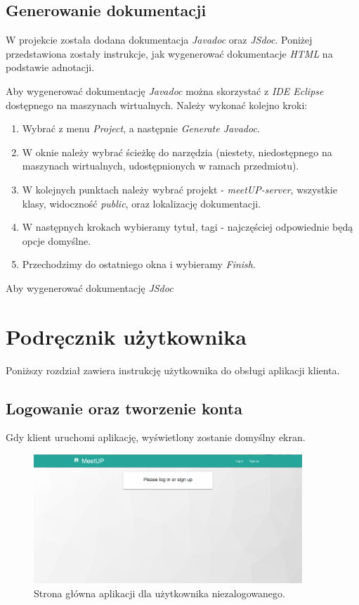 \documentclass[12pt]{article}
\begin{document}
\subsection{Generowanie dokumentacji}
W projekcie została dodana dokumentacja \textit{Javadoc} oraz \textit{JSdoc}. Poniżej przedstawiona zostały instrukcje, jak wygenerować dokumentacje \textit{HTML} na podstawie adnotacji.

\vspace{0.5cm}

Aby wygenerować dokumentację \textit{Javadoc} można skorzystać z \textit{ IDE Eclipse} dostępnego na maszynach wirtualnych. Należy wykonać kolejno kroki:
\begin{enumerate}
\item Wybrać z menu \textit{Project}, a następnie \textit{Generate Javadoc}.
\item W oknie należy wybrać ścieżkę do narzędzia (niestety, niedostępnego na maszynach wirtualnych, udostępnionych w ramach przedmiotu).
\item W kolejnych punktach należy wybrać projekt - \textit{meetUP-server}, wszystkie klasy, widoczność \textit{public}, oraz lokalizację dokumentacji.
\item W następnych krokach wybieramy tytuł, tagi - najczęściej odpowiednie będą opcje domyślne.
\item Przechodzimy do ostatniego okna i wybieramy \textit{Finish}.
\end{enumerate}

\vspace{0.5cm}
Aby wygenerować dokumentację \textit{JSdoc} 

\pagebreak
\section{Podręcznik użytkownika}
\label{sec:guide}
Poniższy rozdział zawiera instrukcję użytkownika do obsługi aplikacji klienta.
\subsection{Logowanie oraz tworzenie konta}
Gdy klient uruchomi aplikację, wyświetlony zostanie domyślny ekran.

\begin{figure}[H]
\centering
\includegraphics[width=0.9\textwidth]{meetup_main.png}
\caption{Strona główna aplikacji dla użytkownika niezalogowanego.}
\end{figure}
\end{document}
